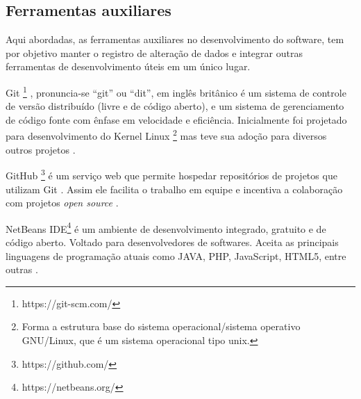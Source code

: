 \subsection{Ferramentas auxiliares}


Aqui abordadas, as ferramentas auxiliares no desenvolvimento do software, tem por objetivo manter o registro de alteração de dados e integrar outras ferramentas de desenvolvimento úteis em um único lugar. 

Git \footnote{https://git-scm.com/}  , pronuncia-se “git” ou “dit”, em inglês britânico é um sistema de controle de versão distribuído (livre e de código aberto), e um sistema de gerenciamento de código fonte com ênfase em velocidade e eficiência. Inicialmente foi projetado para desenvolvimento do Kernel Linux \footnote{Forma a estrutura base do sistema operacional/sistema operativo GNU/Linux, que é um sistema operacional tipo unix.}   mas teve sua adoção para diversos outros projetos  \cite{moreira2016desbravando}.

GitHub \footnote{https://github.com/}   é um serviço web que permite hospedar repositórios de projetos que utilizam Git . Assim ele facilita o trabalho em equipe e incentiva a  colaboração com projetos \textit{open source} \cite{moreira2016desbravando}.

NetBeans IDE\footnote{https://netbeans.org/}   é um ambiente de desenvolvimento integrado, gratuito e de código aberto. Voltado para desenvolvedores de softwares. Aceita as principais linguagens de programação atuais como JAVA, PHP, JavaScript, HTML5, entre outras \cite{tonu2012php}.



